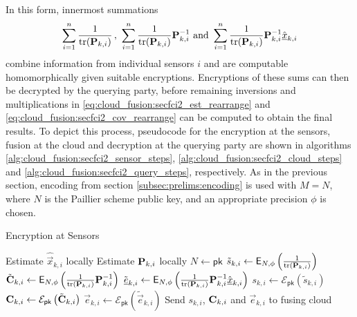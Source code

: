 In this form, innermost summations  
\begin{equation}
        \sum_{i=1}^n \frac{1}{\tr(\mat{P}_{k,i})}\,,\ \sum_{i=1}^n \frac{1}{\tr(\mat{P}_{k,i})}\mat{P}_{k,i}^{-1}\text{ and }\sum_{i=1}^n\frac{1}{\tr(\mat{P}_{k,i})}\mat{P}_{k,i}^{-1}\hat{\vec{x}}_{k,i}
\end{equation}
combine information from individual sensors $i$ and are computable homomorphically given suitable encryptions. Encryptions of these sums can then be decrypted by the querying party, before remaining inversions and multiplications in \eqref{eq:cloud_fusion:secfci2_est_rearrange} and \eqref{eq:cloud_fusion:secfci2_cov_rearrange} can be computed to obtain the final results. To depict this process, pseudocode for the encryption at the sensors, fusion at the cloud and decryption at the querying party are shown in algorithms \ref{alg:cloud_fusion:secfci2_sensor_steps}, \ref{alg:cloud_fusion:secfci2_cloud_steps} and \ref{alg:cloud_fusion:secfci2_query_steps}, respectively. As in the previous section, encoding from section \ref{subsec:prelims:encoding} is used with $M=N$, where $N$ is the Paillier scheme public key, and an appropriate precision $\phi$ is chosen.
\begin{algorithm}[htbp]
\caption{Encryption at Sensors}\label{alg:cloud_fusion:secfci2_sensor_steps}
\begin{algorithmic}[1]
    \State Estimate $\hat{\vec{x}}_{k,i}$ locally
    \State Estimate ${{\mathbf{P}}}_{k,i}$ locally
    \State $N \gets \mathsf{pk}$
    \State $\tilde{s}_{k,i} \gets \mathsf{E}_{N,\phi}\left(\frac{1}{\operatorname{tr}({{\mathbf{P}}}_{k,i})}\right)$
    \State $\tilde{{{\mathbf{C}}}}_{k,i} \gets \mathsf{E}_{N,\phi}\left(\frac{1}{\operatorname{tr}({{\mathbf{P}}}_{k,i})}{{\mathbf{P}}}_{k,i}^{-1}\right)$
    \State $\tilde{{\underline{e}}}_{k,i} \gets \mathsf{E}_{N,\phi}\left(\frac{1}{\operatorname{tr}({{\mathbf{P}}}_{k,i})}{{\mathbf{P}}}_{k,i}^{-1}\hat{{\underline{x}}}_{k,i}\right)$
    \State $s_{k,i} \gets \mathcal{E}_{\mathsf{pk}}\left(\tilde{s}_{k,i}\right)$
    \State ${{\mathbf{C}}}_{k,i} \gets \mathcal{E}_{\mathsf{pk}}\left(\tilde{{{\mathbf{C}}}}_{k,i}\right)$
    \State $\vec{e}_{k,i} \gets \mathcal{E}_{\mathsf{pk}}\left(\tilde{\vec{e}}_{k,i}\right)$
    \State Send $s_{k,i}$, ${{\mathbf{C}}}_{k,i}$ and $\vec{e}_{k,i}$ to fusing cloud
    \EndProcedure
\end{algorithmic}
\end{algorithm}
